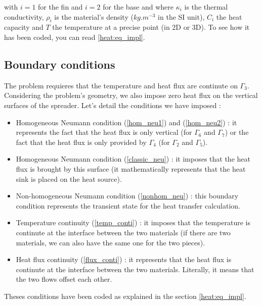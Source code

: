 \noindent with $i=1$ for the fin and $i=2$ for the base and where $\kappa_i$ is the thermal conductivity, $\rho_i$ is the material's density ($kg.m^{-3}$ in the SI unit), $C_i$ the heat capacity and $T$ the temperature at a precise point (in 2D or 3D). To see how it has been coded, you can read \ref{heat:eq_impl}.


\subsection{Boundary conditions}
\label{heat:bc}
The problem requieres that the temperature and heat flux are continute on $\Gamma_3$. Considering the problem's geometry, we also impose zero heat flux on the vertical surfaces of the spreader. Let's detail the conditions we have imposed :
\begin{itemize}
\item Homogeneous Neumann condition (\ref{hom_neu1}) and (\ref{hom_neu2}) : it represents the fact that the heat flux is only vertical (for $\Gamma_6$ and $\Gamma_7$) or the fact that the heat flux is only provided by $\Gamma_4$ (for $\Gamma_2$ and $\Gamma_5$).

\item Homogeneous Neumann condition (\ref{classic_neu}) : it imposes that the heat flux is brought by this surface (it mathematically represents that the heat sink is placed on the heat source).

\item Non-homogeneous Neumann condition (\ref{nonhom_neu}) :  this boundary condition represents the transient state for the heat transfer calculation.

\item Temperature continuity (\ref{temp_conti}) : it imposes that the temperature is continute at the interface between the two materials (if there are two materials, we can also have the same one for the two pieces).

\item Heat flux continuity (\ref{flux_conti}) : it represents that the heat flux is continute at the interface between the two materials. Literally, it means that the two flows offset each other.

\end{itemize}

\noindent Theses conditions have been coded as explained in the section \ref{heat:eq_impl}.

